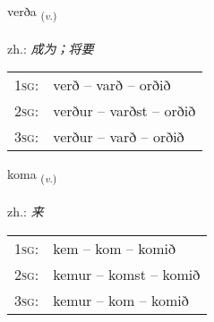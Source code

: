 \documentclass[frontgrid, backgrid]{flacards}\usepackage[]{graphicx}\usepackage[]{xcolor}
\begin{document}
{verða \small{\textsubscript{(\textit{v.})}} \\[1ex] %
\textphonetic{[vɛrða]} \\
zh.: \emph{成为；将要} \\  [2ex]
\renewcommand*{\arraystretch}{0.8}
\begin{tabular}{p{1cm}l}
\textsc{1sg}: & verð -- varð -- orðið \\ 
\textsc{2sg}: & verður -- varðst -- orðið \\ 
\textsc{3sg}: & verður -- varð -- orðið \\ 
\end{tabular}
}

\renewcommand{\flhead}{\vskip5pt \fboxsep=0pt {\small\bfseries\footnotesize Sagnorð | 动词}}
\renewcommand{\fcfoot}{\vskip5pt \fboxsep=0pt \hspace{2pt}{\small\bfseries\footnotesize 1K}}

\renewcommand{\blhead}{\vskip5pt {\small\bfseries\footnotesize Sagnorð | 动词 }}
\renewcommand{\bcfoot}{\vskip5pt \hspace{2pt}{\small\bfseries\footnotesize 1K}}


{koma \small{\textsubscript{(\textit{v.})}} \\[1ex] %
\textphonetic{[kʰɔːma]} \\
zh.: \emph{来} \\  [2ex]
\renewcommand*{\arraystretch}{0.8}
\begin{tabular}{p{1cm}l}
\textsc{1sg}: & kem -- kom -- komið \\ 
\textsc{2sg}: & kemur -- komst -- komið \\ 
\textsc{3sg}: & kemur -- kom -- komið \\ 
\end{tabular}
}

\renewcommand{\flhead}{\vskip5pt \fboxsep=0pt {\small\bfseries\footnotesize Fornafn | 代词}}
\renewcommand{\fcfoot}{\vskip5pt \fboxsep=0pt \hspace{2pt}{\small\bfseries\footnotesize 1K}}
\end{document}
